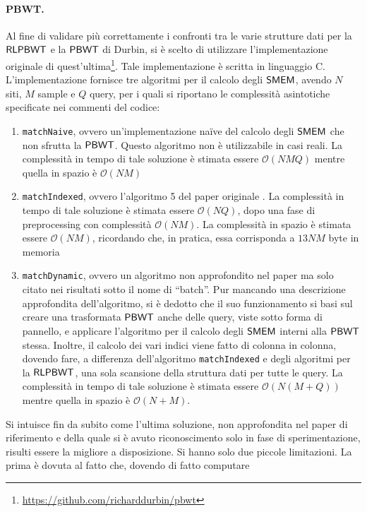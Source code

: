\paragraph{PBWT.}
Al fine di validare più correttamente i confronti tra le varie strutture dati
per la $\mbox{\rm {\sf RLPBWT}}$ e la $\mbox{\rm {\sf PBWT}}$ di Durbin, si è scelto di utilizzare
l'implementazione originale di
quest'ultima\footnote{\url{https://github.com/richarddurbin/pbwt}}. Tale
implementazione è scritta in 
linguaggio C. L'implementazione
fornisce tre algoritmi per il calcolo degli $\mbox{\rm {\sf SMEM}}$, avendo $N$ siti, $M$ sample
e $Q$ query, per i quali si riportano le complessità asintotiche specificate
nei commenti del codice: 
\begin{enumerate}
  \item \texttt{matchNaive}, ovvero un'implementazione na\"{i}ve del calcolo
  degli $\mbox{\rm {\sf SMEM}}$ che non sfrutta la $\mbox{\rm {\sf PBWT}}$. Questo algoritmo non è
  utilizzabile in casi reali. La complessità in tempo di tale 
  soluzione è stimata essere $\mathcal{O}(NMQ)$ mentre quella in spazio è
  $\mathcal{O}(NM)$
  \item \texttt{matchIndexed}, ovvero l'algoritmo 5 del paper originale
  \cite{pbwt}. La complessità in tempo di tale 
  soluzione è stimata essere $\mathcal{O}(NQ)$, dopo una fase di preprocessing
  con complessità $\mathcal{O}(NM)$. La complessità in spazio è stimata essere
  $\mathcal{O}(NM)$, ricordando che, in pratica, essa corrisponda a $13NM$
  byte in memoria
  \item \texttt{matchDynamic}, ovvero un algoritmo non approfondito nel paper ma
  solo citato nei risultati sotto il nome di ``batch''. Pur mancando una
  descrizione approfondita dell'algoritmo, si è dedotto che il suo funzionamento
  si basi sul creare una trasformata $\mbox{\rm {\sf PBWT}}$ anche delle query, viste 
  sotto forma di pannello, e applicare l'algoritmo per il calcolo degli $\mbox{\rm {\sf SMEM}}$
  interni alla $\mbox{\rm {\sf PBWT}}$ stessa. Inoltre, il calcolo dei vari indici viene
  fatto di colonna in colonna, dovendo fare, a differenza dell'algoritmo
  \texttt{matchIndexed} e degli algoritmi per la $\mbox{\rm {\sf RLPBWT}}$, una sola scansione
  della struttura dati per tutte le query. La complessità in tempo di tale 
  soluzione è stimata essere $\mathcal{O}(N(M+Q))$ mentre quella in spazio è
  $\mathcal{O}(N+M)$. 
\end{enumerate}
Si intuisce fin da subito come l'ultima soluzione, non approfondita nel paper di
riferimento e della quale si è avuto riconoscimento solo in fase di
sperimentazione, risulti essere la migliore a disposizione. Si hanno solo due
piccole limitazioni. La prima è dovuta al fatto che, dovendo di fatto computare
